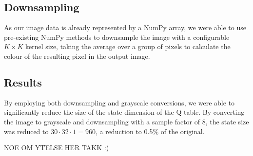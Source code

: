 \subsection{Downsampling}

As our image data is already represented by a NumPy array, we were able to use pre-existing NumPy methods to downsample the image with a configurable $K \times K$ kernel size, taking the average over a group of pixels to calculate the colour of the resulting pixel in the output image.

\subsection{Results}

By employing both downsampling and grayscale conversions, we were able to significantly reduce the size of the state dimension of the Q-table. By converting the image to grayscale and downsampling with a sample factor of 8, the state size was reduced to $30 \cdot 32 \cdot 1 = 960$, a reduction to 0.5\% of the original.

NOE OM YTELSE HER TAKK :)
